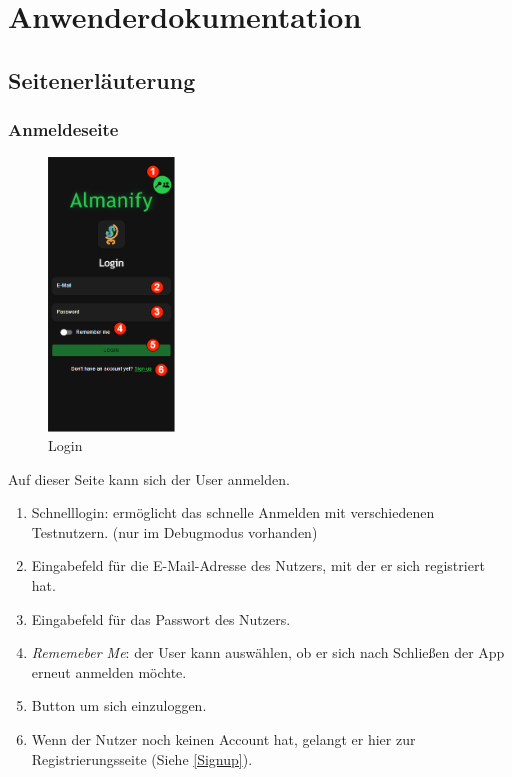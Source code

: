 \section{Anwenderdokumentation}



\subsection{Seitenerläuterung}

\subsubsection{Anmeldeseite}\label{Login}
\begin{figure}[H]
	\centering
	\includegraphics[width=0.3\textwidth]{img/pages_numbers/login.drawio}
	\caption[Login]{Login}
	\label{fig:Login}
\end{figure}

Auf dieser Seite kann sich der User anmelden.

\begin{enumerate}[label=\protect\circled{\arabic*}]
	\item Schnelllogin: ermöglicht das schnelle Anmelden mit verschiedenen Testnutzern. (nur im Debugmodus vorhanden)
	\item Eingabefeld für die E-Mail-Adresse des Nutzers, mit der er sich registriert hat.
	\item Eingabefeld für das Passwort des Nutzers.
	\item \emph{Rememeber Me}: der User kann auswählen, ob er sich nach Schließen der App erneut anmelden möchte.
	\item Button um sich einzuloggen.
	\item Wenn der Nutzer noch keinen Account hat, gelangt er hier zur Registrierungsseite (Siehe \ref{Signup}).
\end{enumerate}

